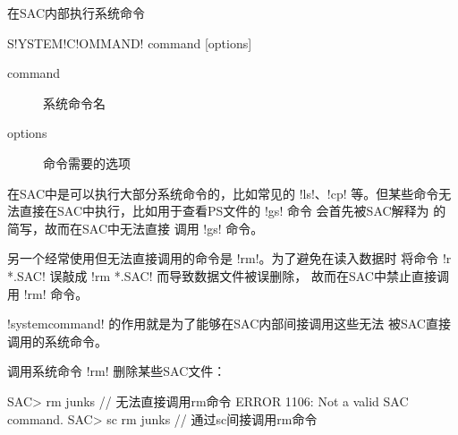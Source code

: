 \label{cmd:systemcommand}

在SAC内部执行系统命令

\begin{SACSTX}
S!YSTEM!C!OMMAND! command [options]
\end{SACSTX}

\begin{description}
\item [command] 系统命令名
\item [options] 命令需要的选项
\end{description}

在SAC中是可以执行大部分系统命令的，比如常见的 !ls!、!cp!
等。但某些命令无法直接在SAC中执行，比如用于查看PS文件的 !gs! 命令
会首先被SAC解释为  的简写，故而在SAC中无法直接
调用 !gs! 命令。

另一个经常使用但无法直接调用的命令是 !rm!。为了避免在读入数据时
将命令 !r *.SAC! 误敲成 !rm *.SAC! 而导致数据文件被误删除，
故而在SAC中禁止直接调用 !rm! 命令。

!systemcommand! 的作用就是为了能够在SAC内部间接调用这些无法
被SAC直接调用的系统命令。

调用系统命令 !rm! 删除某些SAC文件：
\begin{SACCode}
SAC> rm junks           // 无法直接调用rm命令
 ERROR 1106: Not a valid SAC command.
SAC> sc rm junks        // 通过sc间接调用rm命令
\end{SACCode}
